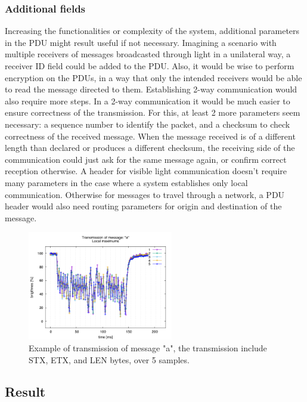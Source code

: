 \subsubsection{Additional fields}
Increasing the functionalities or complexity of the system, additional parameters in the PDU might result useful if not necessary. 
Imagining a scenario with multiple receivers of messages broadcasted through light in a unilateral way, a receiver ID field could be added to the PDU.
 Also, it would be wise to perform encryption on the PDUs, in a way that only the intended receivers would be able to read the message directed to them.
Establishing 2-way communication would also require more steps.
In a 2-way communication it would be much easier to ensure correctness of the transmission. 
For this, at least 2 more parameters seem necessary: a sequence number to identify the packet, and a checksum to check correctness of the received message.
When the message received is of a different length than declared or produces a different checksum, the receiving side of the communication could just ask  for the same message again, or confirm correct reception otherwise.
A header for visible light communication doesn't require many parameters in the case where a system establishes only local communication.
Otherwise for messages to travel through a network, a PDU header would also need routing parameters for origin and destination of the message.

\begin{figure}
\centering
\includegraphics[height=180px]{img/transmission}
\caption{Example of transmission of message "a", the transmission include STX, ETX, and LEN bytes, over 5 samples.}
\label{fig:transmissionA}
\end{figure}

\subsection{Result}

